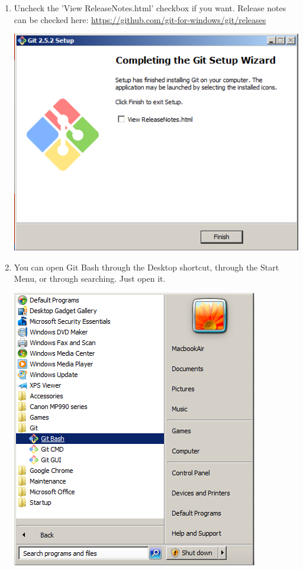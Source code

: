 \documentclass[11pt,fleqn]{article}
\theoremstyle{definition}
\begin{document}
\begin{enumerate}[Step 1.]
\item Uncheck the 'View ReleaseNotes.html' checkbox if you want. Release notes can be checked here: \url{https://github.com/git-for-windows/git/releases}
\begin{center}
\includegraphics[scale=0.6]{gitwininstall11.png}
\end{center}

\newpage
\item You can open Git Bash through the Desktop shortcut, through the Start Menu, or through searching. Just open it.
\begin{center}
\includegraphics[scale=0.6]{gitwininstall12.png}
\end{center}


\end{enumerate}
\end{document}
